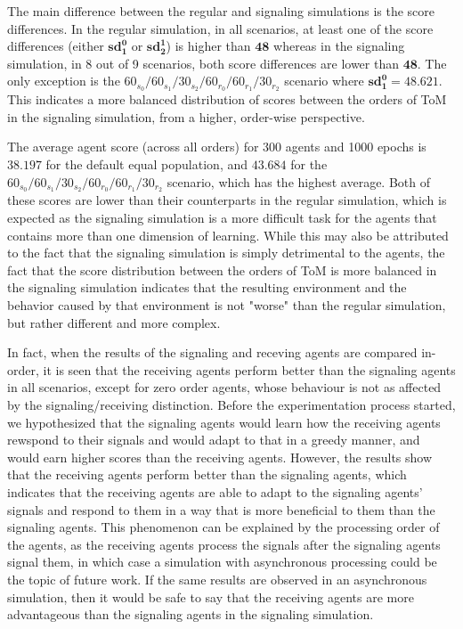 The main difference between the regular and signaling simulations is the score differences. In the regular simulation, in all scenarios, at least one of the score differences (either $\mathbf{sd^0_1}$ or $\mathbf{sd^1_2}$) is higher than $\mathbf{48}$ whereas in the signaling simulation, in 8 out of 9 scenarios, both score differences are lower than $\mathbf{48}$. The only exception is the $60_{s_{0}}/60_{s_{1}}/30_{s_{2}}/60_{r_{0}}/60_{r_{1}}/30_{r_{2}}$ scenario where $\mathbf{sd^0_1 = 48.621}$. This indicates a more balanced distribution of scores between the orders of ToM in the signaling simulation, from a higher, order-wise perspective.

The average agent score (across all orders) for 300 agents and 1000 epochs is $\mathbf{38.197}$ for the default equal population, and $\mathbf{43.684}$ for the $60_{s_{0}}/60_{s_{1}}/30_{s_{2}}/60_{r_{0}}/60_{r_{1}}/30_{r_{2}}$ scenario, which has the highest average. Both of these scores are lower than their counterparts in the regular simulation, which is expected as the signaling simulation is a more difficult task for the agents that contains more than one dimension of learning. While this may also be attributed to the fact that the signaling simulation is simply detrimental to the agents, the fact that the score distribution between the orders of ToM is more balanced in the signaling simulation indicates that the resulting environment and the behavior caused by that environment is not "worse" than the regular simulation, but rather different and more complex.

In fact, when the results of the signaling and receving agents are compared in-order, it is seen that the receiving agents perform better than the signaling agents in all scenarios, except for zero order agents, whose behaviour is not as affected by the signaling/receiving distinction. Before the experimentation process started, we hypothesized that the signaling agents would learn how the receiving agents rewspond to their signals and would adapt to that in a greedy manner, and would earn higher scores than the receiving agents. However, the results show that the receiving agents perform better than the signaling agents, which indicates that the receiving agents are able to adapt to the signaling agents' signals and respond to them in a way that is more beneficial to them than the signaling agents. This phenomenon can be explained by the processing order of the agents, as the receiving agents process the signals after the signaling agents signal them, in which case a simulation with asynchronous processing could be the topic of future work. If the same results are observed in an asynchronous simulation, then it would be safe to say that the receiving agents are more advantageous than the signaling agents in the signaling simulation.


